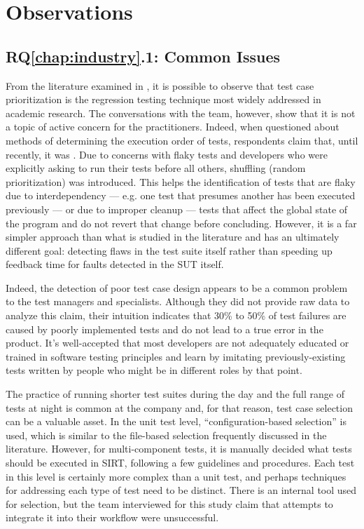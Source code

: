 \section{Observations}
\label{sec:ind_observations}

\subsection{RQ\ref{chap:industry}.1: Common Issues}
\label{sec:ind_rq1}

From the literature examined in , it is possible to observe that test case prioritization is the regression testing technique most widely addressed in academic research.
The conversations with the team, however, show that it is not a topic of active concern for the practitioners.
Indeed, when questioned about methods of determining the execution order of tests, respondents claim that, until recently, it was .
Due to concerns with flaky tests and developers who were explicitly asking to run their tests before all others, shuffling (random prioritization) was introduced.
This helps the identification of tests that are flaky due to interdependency — e.g. one test that presumes another has been executed previously — or due to improper cleanup — tests that affect the global state of the program and do not revert that change before concluding.
However, it is a far simpler approach than what is studied in the literature and has an ultimately different goal: detecting flaws in the test suite itself rather than speeding up feedback time for faults detected in the SUT itself.

Indeed, the detection of poor test case design appears to be a common problem to the test managers and specialists.
Although they did not provide raw data to analyze this claim, their intuition indicates that 30\% to 50\% of test failures are caused by poorly implemented tests and do not lead to a true error in the product.
It's well-accepted that most developers are not adequately educated or trained in software testing principles and learn by imitating previously-existing tests written by people who might be in different roles by that point.

The practice of running shorter test suites during the day and the full range of tests at night is common at the company and, for that reason, test case selection can be a valuable asset.
In the unit test level, ``configuration-based selection'' is used, which is similar to the file-based selection frequently discussed in the literature.
However, for multi-component tests, it is manually decided what tests should be executed in SIRT, following a few guidelines and procedures.
Each test in this level is certainly more complex than a unit test, and perhaps techniques for addressing each type of test need to be distinct.
There is an internal tool used for selection, but the team interviewed for this study claim that attempts to integrate it into their workflow were unsuccessful.

